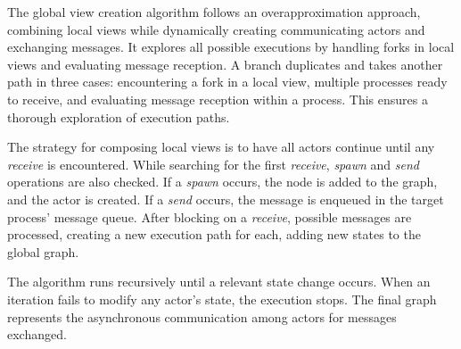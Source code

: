 The global view creation algorithm follows an overapproximation approach,  
combining local views while dynamically creating communicating actors and  
exchanging messages. It explores all possible executions by handling forks in  
local views and evaluating message reception. A branch duplicates and takes  
another path in three cases: encountering a fork in a local view, multiple  
processes ready to receive, and evaluating message reception within a process.  
This ensures a thorough exploration of execution paths.  

The strategy for composing local views is to have all actors continue until  
any \textit{receive} is encountered. While searching for the first \textit{receive},  
\textit{spawn} and \textit{send} operations are also checked. If a \textit{spawn}  
occurs, the node is added to the graph, and the actor is created. If a  
\textit{send} occurs, the message is enqueued in the target process' message  
queue. After blocking on a \textit{receive}, possible messages are processed,  
creating a new execution path for each, adding new states to the global graph.  

The algorithm runs recursively until a relevant state change occurs. When an  
iteration fails to modify any actor's state, the execution stops. The final graph  
represents the asynchronous communication among actors for messages exchanged.  
